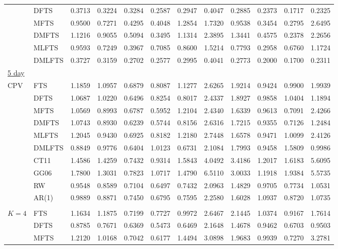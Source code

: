 \documentclass[12pt,a4paper]{article}
\begin{document}
\begin{center}
\begin{small}
\begin{longtable}{@{}llrrrrrrrrrr@{}}
  & DFTS & 0.3713 & 0.3224 & 0.3284 & 0.2587 & 0.2947 & 0.4047 & 0.2885 & 0.2373 & 0.1717 & 0.2325 \\ 
  & MFTS & 0.9500 & 0.7271 & 0.4295 & 0.4048 & 1.2854 & 1.7320 & 0.9538 & 0.3454 & 0.2795 & 2.6495 \\ 
  & DMFTS & 1.1216 & 0.9055 & 0.5094 & 0.3495 & 1.1314 & 2.3895 & 1.3441 & 0.4575 & 0.2378 & 2.2656 \\ 
  & MLFTS & 0.9593 & 0.7249 & 0.3967 & 0.7085 & 0.8600 & 1.5214 & 0.7793 & 0.2958 & 0.6760 & 1.1724 \\ 
  & DMLFTS & 0.3727 & 0.3159 & 0.2702 & 0.2577 & 0.2995 & 0.4041 & 0.2773 & 0.2000 & 0.1700 & 0.2311 \\ 
\underline{5 day} \\
 CPV & FTS & 1.1859 & 1.0957 & 0.6879 & 0.8087 & 1.1277 & 2.6265 & 1.9214 & 0.9424 & 0.9900 & 1.9939 \\ 
  & DFTS & 1.0687 & 1.0220 & 0.6496 & 0.8254 & 0.8017 & 2.4337 & 1.8927 & 0.9858 & 1.0404 & 1.1894 \\ 
  & MFTS & 1.0569 & 0.8993 & 0.6787 & 0.5952 & 1.2104 & 2.4340 & 1.6339 & 0.9613 & 0.7091 & 2.4266 \\ 
  & DMFTS & 1.0743 & 0.8930 & 0.6239 & 0.5744 & 0.8156 & 2.6316 & 1.7215 & 0.9355 & 0.7126 & 1.2484 \\ 
  & MLFTS & 1.2045 & 0.9430 & 0.6925 & 0.8182 & 1.2180 & 2.7448 & 1.6578 & 0.9471 & 1.0099 & 2.4126 \\ 
  & DMLFTS & 0.8849 & 0.9776 & 0.6404 & 1.0123 & 0.6731 & 2.1084 & 1.7993 & 0.9458 & 1.5809 & 0.9986 \\ 
  & CT11 & 1.4586 & 1.4259 & 0.7432 & 0.9314 & 1.5843 & 4.0492 & 3.4186 & 1.2017 & 1.6183 & 5.6095 \\ 
  & GG06 & 1.7800 & 1.3031 & 0.7823 & 1.0717 & 1.4790 & 6.5110 & 3.0033 & 1.1918 & 1.9384 & 5.5735 \\ 
  & RW & 0.9548 & 0.8589 & 0.7104 & 0.6497 & 0.7432 & 2.0963 & 1.4829 & 0.9705 & 0.7734 & 1.0531 \\ 
  & AR(1) & 0.9889 & 0.8871 & 0.7450 & 0.6795 & 0.7595 & 2.2580 & 1.6028 & 1.0937 & 0.8720 & 1.0735 \\ 
\\
 $K=4$ & FTS & 1.1634 & 1.1875 & 0.7199 & 0.7727 & 0.9972 & 2.6467 & 2.1445 & 1.0374 & 0.9167 & 1.7614 \\ 
  & DFTS & 0.8785 & 0.7671 & 0.6369 & 0.5473 & 0.6469 & 2.1648 & 1.4678 & 0.9462 & 0.6703 & 0.9503 \\ 
  & MFTS & 1.2120 & 1.0168 & 0.7042 & 0.6177 & 1.4494 & 3.0898 & 1.9683 & 0.9939 & 0.7270 & 3.2781 \\ 

\end{longtable}
\end{small}
\end{center}
\end{document}
